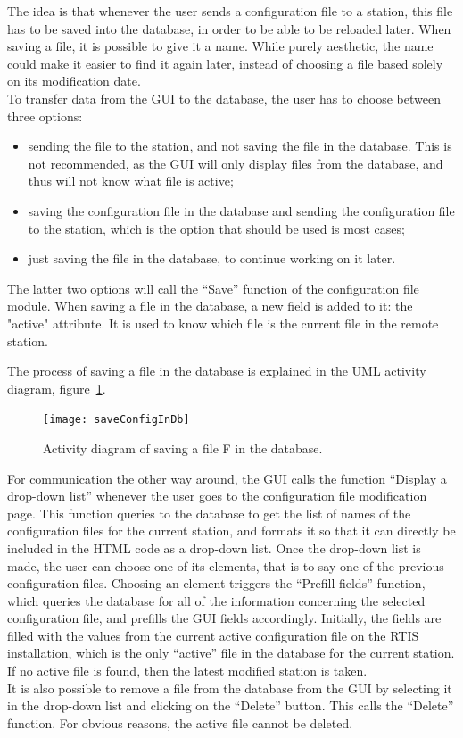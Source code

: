 \documentclass{themeensg}
\begin{document}
The idea is that whenever the user sends a configuration file to a station, this file has to be saved into the database, in order to be able to be reloaded later. When saving a file, it is possible to give it a name. While purely aesthetic, the name could make it easier to find it again later, instead of choosing a file based solely on its modification date.\\
To transfer data from the GUI to the database, the user has to choose between three options: \begin{itemize}
\item sending the file to the station, and not saving the file in the database. This is not recommended, as the GUI will only display files from the database, and thus will not know what file is active;
\item saving the configuration file in the database and sending the configuration file to the station, which is the option that should be used is most cases;
\item just saving the file in the database, to continue working on it later.
\end{itemize}
The latter two options will call the “Save” function of the configuration file module. When saving a file in the database, a new field is added to it: the "active" attribute. It is used to know which file is the current file in the remote station.

The process of saving a file in the database is explained in the UML activity diagram, figure~\ref{fig:saveConfig}.\\

\begin{figure}[ht]
	\centering
	\texttt{[image: saveConfigInDb]}
	\caption{Activity diagram of saving a file F in the database.}
	\label{fig:saveConfig}
\end{figure}

For communication the other way around, the GUI calls the function “Display a drop-down list” whenever the user goes to the configuration file modification page. This function queries to the database to get the list of names of the configuration files for the current station, and formats it so that it can directly be included in the HTML code as a drop-down list. Once the drop-down list is made, the user can choose one of its elements, that is to say one of the previous configuration files. Choosing an element triggers the “Prefill fields” function, which queries the database for all of the information concerning the selected configuration file, and prefills the GUI fields accordingly. Initially, the fields are filled with the values from the current active configuration file on the RTIS installation, which is the only “active” file in the database for the current station. If no active file is found, then the latest modified station is taken.\\
It is also possible to remove a file from the database from the GUI by selecting it in the drop-down list and clicking on the “Delete” button. This calls the “Delete” function. For obvious reasons, the active file cannot be deleted.
\end{document}
